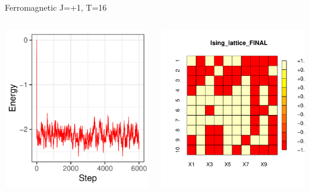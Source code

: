 \documentclass{beamer}
\begin{document}
\begin{frame}{Ferromagnetic J=+1, T=16}
\begin{columns}
\begin{column}{0.5\textwidth}
    \begin{center}
     \includegraphics[width=\textwidth]{Pic/J+1_10_2500_T=16_ENERGY.pdf}
     \end{center}
\end{column}
\begin{column}{0.5\textwidth}
    \begin{center}
     \includegraphics[width=\textwidth]{Pic/J+1_10_2500_T=16_FINAL.pdf}

\end{center}
\end{column}
\end{columns}
\end{frame}
\end{document}
